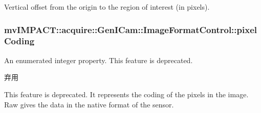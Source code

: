 Vertical offset from the origin to the region of interest (in pixels). \hypertarget{classmv_i_m_p_a_c_t_1_1acquire_1_1_gen_i_cam_1_1_image_format_control_a9eac6c5f816b0325c6d82d6007b44c33}{
\subsubsection[{pixel\+Coding}]{ mv\+I\+M\+P\+A\+C\+T\+::acquire\+::\+Gen\+I\+Cam\+::\+Image\+Format\+Control\+::pixel\+Coding}}\label{classmv_i_m_p_a_c_t_1_1acquire_1_1_gen_i_cam_1_1_image_format_control_a9eac6c5f816b0325c6d82d6007b44c33}


An enumerated integer property. This feature is deprecated. 

\begin{DoxyRefDesc}{弃用}
\item[\hyperlink{deprecated__deprecated000041}{弃用}]This feature is deprecated. It represents the coding of the pixels in the image. Raw gives the data in the native format of the sensor.\end{DoxyRefDesc}


